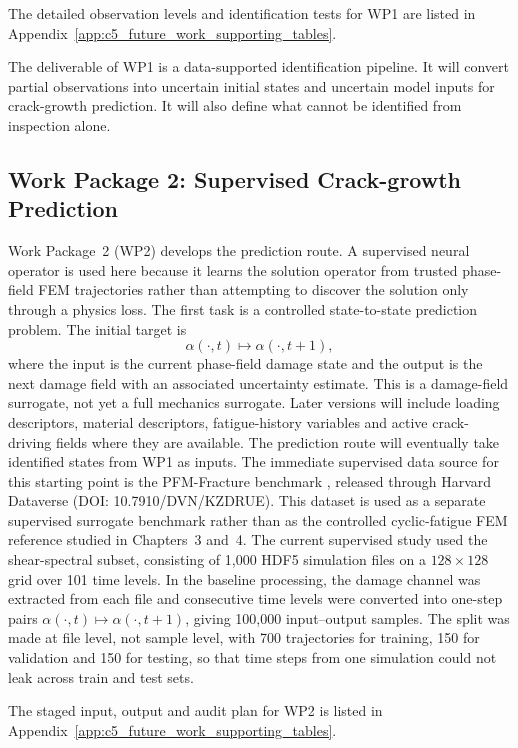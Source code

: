 The detailed observation levels and identification tests for WP1 are listed in Appendix~\ref{app:c5_future_work_supporting_tables}.

The deliverable of WP1 is a data-supported identification pipeline.
It will convert partial observations into uncertain initial states and uncertain model inputs for crack-growth prediction.
It will also define what cannot be identified from inspection alone.

\subsection{Work Package 2: Supervised Crack-growth Prediction}

Work Package~2 (WP2) develops the prediction route.
A supervised neural operator is used here because it learns the solution operator from trusted phase-field FEM trajectories rather than attempting to discover the solution only through a physics loss.
The first task is a controlled state-to-state prediction problem. The initial target is
\[
    \alpha(\cdot,t) \mapsto \alpha(\cdot,t+1),
\]
where the input is the current phase-field damage state and the output is the next damage field with an associated uncertainty estimate.
This is a damage-field surrogate, not yet a full mechanics surrogate.
Later versions will include loading descriptors, material descriptors, fatigue-history variables and active crack-driving fields where they are available.
The prediction route will eventually take identified states from WP1 as inputs.
The immediate supervised data source for this starting point is the PFM-Fracture benchmark \citep{HamdiLejeune2025PFMBenchmark}, released through Harvard Dataverse (DOI: 10.7910/DVN/KZDRUE).
This dataset is used as a separate supervised surrogate benchmark rather than as the controlled cyclic-fatigue FEM reference studied in Chapters~3 and~4.
The current supervised study used the shear-spectral subset, consisting of 1,000 HDF5 simulation files on a $128\times128$ grid over 101 time levels.
In the baseline processing, the damage channel was extracted from each file and consecutive time levels were converted into one-step pairs $\alpha(\cdot,t)\mapsto\alpha(\cdot,t+1)$, giving 100,000 input--output samples.
The split was made at file level, not sample level, with 700 trajectories for training, 150 for validation and 150 for testing, so that time steps from one simulation could not leak across train and test sets.

The staged input, output and audit plan for WP2 is listed in Appendix~\ref{app:c5_future_work_supporting_tables}.

